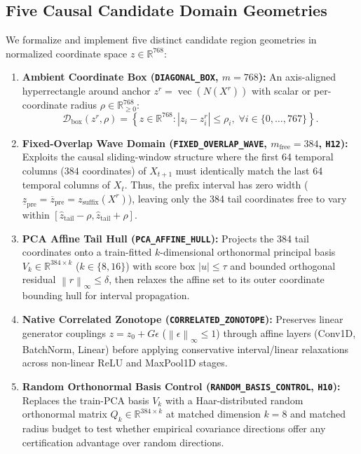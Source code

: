 \documentclass[11pt,a4paper]{article}
\newcommand{\R}{\mathbb{R}}
\newcommand{\norm}[1]{\left\lVert #1\right\rVert}
\newcommand{\abs}[1]{\left\lvert #1\right\rvert}
\newcommand{\code}[1]{{\small\ttfamily\nolinkurl{#1}}}
\newcommand{\vecop}{\operatorname{vec}}
\newcommand{\Dset}{\mathcal{D}}
\theoremstyle{remark}
\begin{document}
\subsection{Five Causal Candidate Domain Geometries}
We formalize and implement five distinct candidate region geometries in normalized coordinate space $z \in \R^{768}$:
\begin{enumerate}
  \item \textbf{Ambient Coordinate Box (\code{DIAGONAL\_BOX}, $m=768$):}
  An axis-aligned hyperrectangle around anchor $z^r = \vecop(N(X^r))$ with scalar or per-coordinate radius $\rho \in \R^{768}_{\ge 0}$:
  \begin{equation}
    \Dset_{\text{box}}(z^r, \rho) = \left\{ z \in \R^{768} : \abs{z_i - z^r_i} \le \rho_i, \; \forall i \in \{0,\dots,767\} \right\}.
  \end{equation}
  \item \textbf{Fixed-Overlap Wave Domain (\code{FIXED\_OVERLAP\_WAVE}, $m_{\text{free}}=384$, \code{H12}):}
  Exploits the causal sliding-window structure where the first 64 temporal columns ($384$ coordinates) of $X_{t+1}$ must identically match the last 64 temporal columns of $X_t$. Thus, the prefix interval has zero width ($\underline{z}_{\text{pre}} = \overline{z}_{\text{pre}} = z_{\text{suffix}}(X^r)$), leaving only the 384 tail coordinates free to vary within $[\hat{z}_{\text{tail}} - \rho, \hat{z}_{\text{tail}} + \rho]$.
  \item \textbf{PCA Affine Tail Hull (\code{PCA\_AFFINE\_HULL}):}
  Projects the 384 tail coordinates onto a train-fitted $k$-dimensional orthonormal principal basis $V_k \in \R^{384 \times k}$ ($k \in \{8, 16\}$) with score box $\abs{u} \le \tau$ and bounded orthogonal residual $\norm{r}_\infty \le \delta$, then relaxes the affine set to its outer coordinate bounding hull for interval propagation.
  \item \textbf{Native Correlated Zonotope (\code{CORRELATED\_ZONOTOPE}):}
  Preserves linear generator couplings $z = z_0 + G \epsilon$ ($\norm{\epsilon}_\infty \le 1$) through affine layers (Conv1D, BatchNorm, Linear) before applying conservative interval/linear relaxations across non-linear ReLU and MaxPool1D stages.
  \item \textbf{Random Orthonormal Basis Control (\code{RANDOM\_BASIS\_CONTROL}, \code{H10}):}
  Replaces the train-PCA basis $V_k$ with a Haar-distributed random orthonormal matrix $Q_k \in \R^{384 \times k}$ at matched dimension $k=8$ and matched radius budget to test whether empirical covariance directions offer any certification advantage over random directions.
\end{enumerate}
\end{document}
